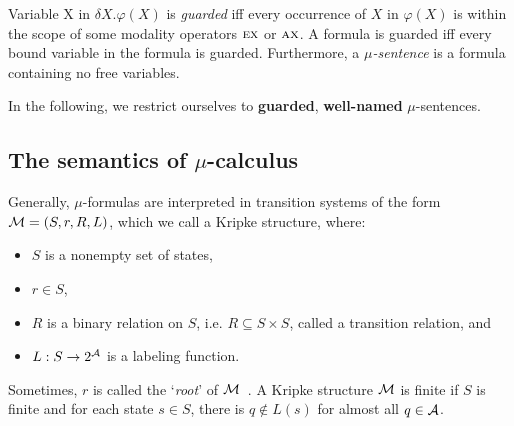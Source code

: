 \documentclass[runningheads]{llncs}
\begin{document}
Variable X in $\delta X. \varphi(X)$ is \emph{guarded} iff every occurrence of $X$ in
$\varphi(X)$ is within the scope of some modality operators $\textsc{e} \textsc{x}$ or $\textsc{a} \textsc{x}$.
A formula is guarded iff every bound variable in the formula is guarded. Furthermore, a \emph{$\mu$-sentence} is a formula containing no free
variables.%

In the following, we restrict ourselves to \textbf{guarded}, \textbf{well-named} $\mu$-sentences.


\subsection{The semantics of $\mu$-calculus}\label{mu-semantic}
Generally, $\mu$-formulas are interpreted in transition systems of the form ${\cal M} = (S, r, R, L)$, which we call a Kripke structure, where:
\begin{itemize}
	\item $S$ is a nonempty set of states,
	\item $r\in S$,
	\item $R$ is a binary relation on $S$, i.e. $R \subseteq S \times S$, called a transition relation, and
	\item $L: S \rightarrow 2^{{\cal A}}$ is a labeling function.
\end{itemize}
Sometimes, $r$ is called the `\emph{root}' of ${\cal M}$~\cite{d2000logical}. A Kripke structure ${\cal M}$ is finite if $S$ is finite and 
for each state $s\in S$, there is $q \not \in L(s)$ for almost all $q\in {\cal A}$.
\end{document}

